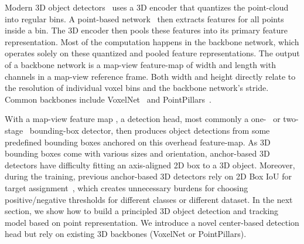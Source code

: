 \documentclass[final]{cvpr}
\begin{document}
Modern 3D object detectors~\cite{voxelnet,yan2018second,pillar,sassd} uses a 3D encoder that quantizes the point-cloud into regular bins.
A point-based network~\cite{qi2017pointnet} then extracts features for all points inside a bin.
The 3D encoder then pools these features into its primary feature representation.
Most of the computation happens in the backbone network, which operates solely on these quantized and pooled feature representations.
The output of a backbone network is a map-view feature-map  of width  and length  with  channels in a map-view reference frame.
Both width and height directly relate to the resolution of individual voxel bins and the backbone network's stride.
Common backbones include VoxelNet~\cite{voxelnet,yan2018second} and PointPillars~\cite{pillar}. 

With a map-view feature map , a detection head, most commonly a one-~\cite{focal2017} or two-stage~\cite{ren2015faster} bounding-box detector, then produces object detections from some predefined bounding boxes anchored on this overhead feature-map.
As 3D bounding boxes come with various sizes and orientation, anchor-based 3D detectors have difficulty fitting an axis-aligned 2D box to a 3D object. 
Moreover, during the training, previous anchor-based 3D detectors rely on 2D Box IoU for target assignment~\cite{yan2018second, pvrcnn}, which creates unnecessary burdens for choosing positive/negative thresholds for different classes or different dataset. 
In the next section, we show how to build a principled 3D object detection and tracking model based on point representation.  
We introduce a novel center-based detection head but rely on existing 3D backbones (VoxelNet or PointPillars). 
\end{document}
